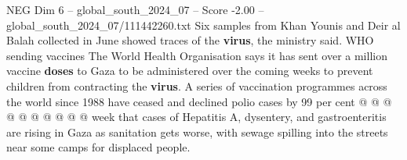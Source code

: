 \begin{textsample}{NEG Dim 6 – global\_south\_2024\_07 – Score -2.00 – global\_south\_2024\_07/111442260.txt}
Six samples from Khan Younis and Deir al Balah collected in June showed traces of the \textbf{virus}, the ministry said.
WHO sending vaccines The World Health Organisation says it has sent over a million vaccine \textbf{doses} to Gaza to be administered over the coming weeks to prevent children from contracting the \textbf{virus}.
A series of vaccination programmes across the world since 1988 have ceased and declined polio cases by 99 per cent @ @ @ @ @ @ @ @ @ @ week that cases of Hepatitis A, dysentery, and gastroenteritis are rising in Gaza as sanitation gets worse, with sewage spilling into the streets near some camps for displaced people.

\end{textsample}
